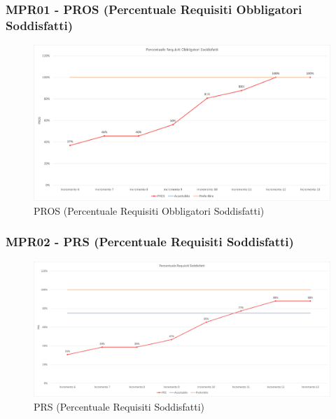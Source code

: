 \subsubsection{MPR01 - PROS (Percentuale Requisiti Obbligatori Soddisfatti)}
\begin{figure}[!ht]
    \caption{PROS (Percentuale Requisiti Obbligatori Soddisfatti)}
    \vspace{10px}
    \includegraphics[scale=0.5]{sezioni/immagini/PROS.png}
    \centering
\end{figure}
\subsubsection{MPR02 - PRS (Percentuale Requisiti Soddisfatti)}
\begin{figure}[!ht]
    \caption{PRS (Percentuale Requisiti Soddisfatti)}
    \vspace{10px}
    \includegraphics[scale=0.5]{sezioni/immagini/PRS.png}
    \centering
\end{figure}
\pagebreak

